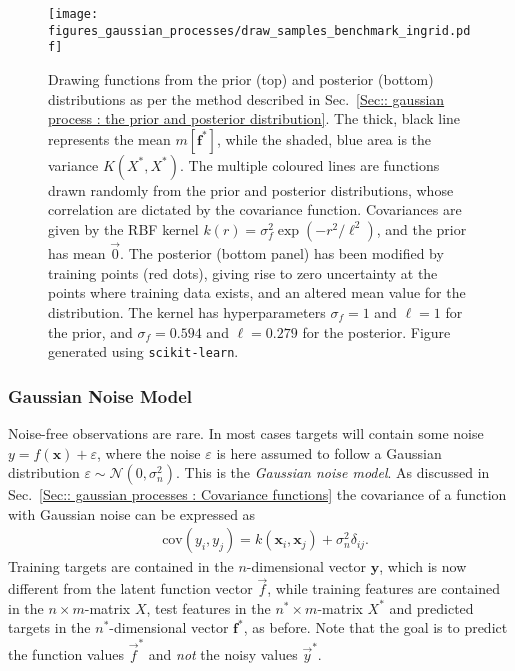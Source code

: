 \documentclass[twoside,english]{uiofysmaster}
\begin{document}
{{\begin{figure}
\centering
\texttt{[image: figures\_gaussian\_processes/draw\_samples\_benchmark\_ingrid.pdf]}
\caption{Drawing functions from the prior (top) and posterior (bottom) distributions as per the method described in Sec.~\ref{Sec:: gaussian process : the prior and posterior distribution}. The thick, black line represents the mean $m[\textbf{f}^*]$, while the shaded, blue area is the variance $K(X^*, X^*)$. The multiple coloured lines are functions drawn randomly from the prior and posterior distributions, whose correlation are dictated by the covariance function. Covariances are given by the RBF kernel $k(r) = \sigma_f^2 \exp(-r^2/\ell^2)$, and the prior has mean $\vec{0}$. The posterior (bottom panel) has been modified by training points (red dots), giving rise to zero uncertainty at the points where training data exists, and an altered mean value for the distribution. The kernel has hyperparameters $\sigma_f = 1$ and $\ell = 1$ for the prior, and $\sigma_f = 0.594$ and $\ell = 0.279$ for the posterior. Figure generated using {\tt scikit-learn}.}
\label{Fig:: gaussian process : prior posterior drawn samples}
\end{figure}

\subsubsection{Gaussian Noise Model}\label{Sec: gaussian process : Gaussian Noise Model}

Noise-free observations are rare. In most cases targets will contain some noise $y = f(\textbf{x}) + \varepsilon$, where the noise $\varepsilon$ is here assumed to follow a Gaussian distribution $\varepsilon \sim \mathcal{N}(0, \sigma_n^2)$. This is the \textit{Gaussian noise model}. As discussed in Sec.~\ref{Sec:: gaussian processes : Covariance functions} the covariance of a function with Gaussian noise can be expressed as
\begin{align}
&\text{cov}(y_i, y_j) = k(\textbf{x}_i, \textbf{x}_j) + \sigma_n^2 \delta_{ij}.
\end{align}
Training targets are contained in the $n$-dimensional vector $\textbf{y}$, which is now different from the latent function vector $\vec{f}$, while training features are contained in the $n \times m$-matrix $X$, test features in the $n^* \times m$-matrix $X^*$ and predicted targets in the $n^*$-dimensional vector $\textbf{f}^*$, as before. Note that the goal is to predict the function values $\vec{f}^*$ and \textit{not} the noisy values $\vec{y}^*$. 

}}
\end{document}
